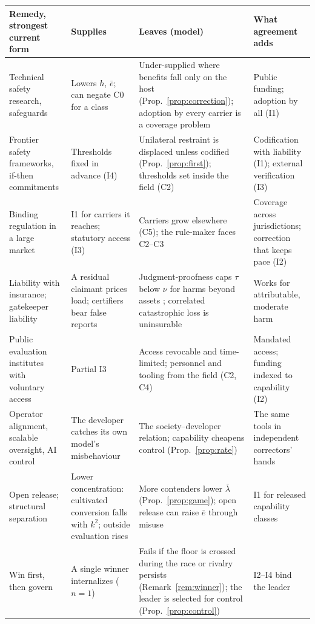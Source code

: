 \documentclass[letterpaper]{article} %
\theoremstyle{definition}
\begin{document}
\begin{table}[t]
\centering
\small
\setlength{\tabcolsep}{3.5pt}
\begin{tabular}{@{}>{\raggedright\arraybackslash}p{3.2cm}>{\raggedright\arraybackslash}p{3.9cm}>{\raggedright\arraybackslash}p{6.4cm}>{\raggedright\arraybackslash}p{3.6cm}@{}}
\toprule
Remedy, strongest current form & Supplies & Leaves (model) & What agreement adds \\
\midrule
Technical safety research, safeguards & Lowers $h$, $\bar e$; can negate C0 for a class & Under-supplied where benefits fall only on the host (Prop.~\ref{prop:correction}); adoption by every carrier is a coverage problem & Public funding; adoption by all (I1) \\
Frontier safety frameworks, if-then commitments \citep{karnofsky2024} & Thresholds fixed in advance (I4) & Unilateral restraint is displaced unless codified (Prop.~\ref{prop:first}); thresholds set inside the field (C2) & Codification with liability (I1); external verification (I3) \\
Binding regulation in a large market \citep{euaiact2024} & I1 for carriers it reaches; statutory access (I3) & Carriers grow elsewhere (C5); the rule-maker faces C2--C3 & Coverage across jurisdictions; correction that keeps pace (I2) \\
Liability with insurance; gatekeeper liability & A residual claimant prices load; certifiers bear false reports & Judgment-proofness caps $\tau$ below $\nu$ for harms beyond assets \citep{shavell1986}; correlated catastrophic loss is uninsurable & Works for attributable, moderate harm \\
Public evaluation institutes with voluntary access & Partial I3 & Access revocable and time-limited; personnel and tooling from the field (C2, C4) & Mandated access; funding indexed to capability (I2) \\
Operator alignment, scalable oversight, AI control & The developer catches its own model's misbehaviour & The society--developer relation; capability cheapens control (Prop.~\ref{prop:rate}) & The same tools in independent correctors' hands \\
Open release; structural separation & Lower concentration: cultivated conversion falls with $k^2$; outside evaluation rises & More contenders lower $\bar\lambda$ (Prop.~\ref{prop:game}); open release can raise $\bar e$ through misuse & I1 for released capability classes \\
Win first, then govern & A single winner internalizes ($n=1$) & Fails if the floor is crossed during the race or rivalry persists (Remark~\ref{rem:winner}); the leader is selected for control (Prop.~\ref{prop:control}) & I2--I4 bind the leader \\

\end{tabular}
\end{table}
\end{document}
